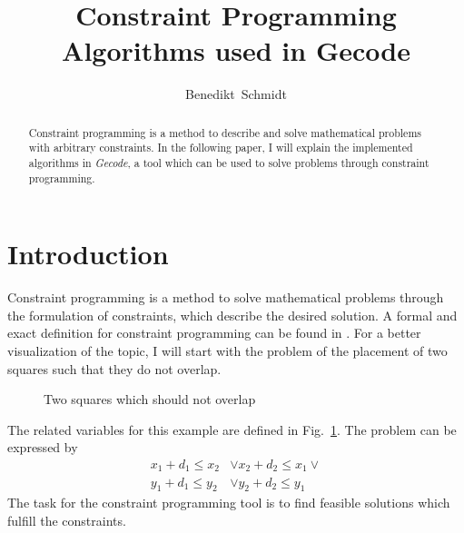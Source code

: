 \documentclass[10pt,
               a4paper,
               journal,
               ]{IEEEtran}
\makeatletter
\def\markboth#1#2{\def\leftmark{\@IEEEcompsoconly{\sffamily}\MakeUppercase{\protect#1}}%
\def\rightmark{\@IEEEcompsoconly{\sffamily}\MakeUppercase{\protect#2}}}
\newcommand{\reffig}[1]{{Fig.~\ref{#1}}}
\makeatother
\begin{document}
	\title{Constraint Programming Algorithms used in Gecode}
	\author{Benedikt~Schmidt}
	\markboth{Advanced Seminar for Security in Information Technology, Summer Term 2014}%
	{Benedikt Schmidt: Constraint Programming - Inside \emph{Gecode}}	
	\maketitle	
	
	\begin{abstract}	
		Constraint programming is a method to describe and solve mathematical problems with arbitrary constraints. In the following paper, I will explain the implemented algorithms in \emph{Gecode}, a tool which can be used to solve problems through constraint programming.
	\end{abstract}
	
	\section{Introduction}
	Constraint programming is a method to solve mathematical problems through the formulation of constraints, which describe the desired solution. A formal and exact definition for constraint programming can be found in \cite[p.~16]{handbookCP}. For a better visualization of the topic, I will start with the problem of the placement of two squares such that they do not overlap.	
	
	\begin{figure}[b]
		\center
		\caption{Two squares which should not overlap}
		\label{fig:squares}
	\end{figure}
	
	The related variables for this example are defined in \reffig{fig:squares}. The problem can be expressed by \cite[p. 101]{programmingGecode}
	\begin{equation}
	\begin{split}
		x_1 + d_1 \le x_2 & \lor x_2 + d_2 \le x_1 \lor \\
		y_1 + d_1 \le y_2 & \lor y_2 + d_2 \le y_1
	\end{split}
	\label{eq:squares}
	\end{equation}
	The task for the constraint programming tool is to find feasible solutions which fulfill the constraints.
	
\end{document}
